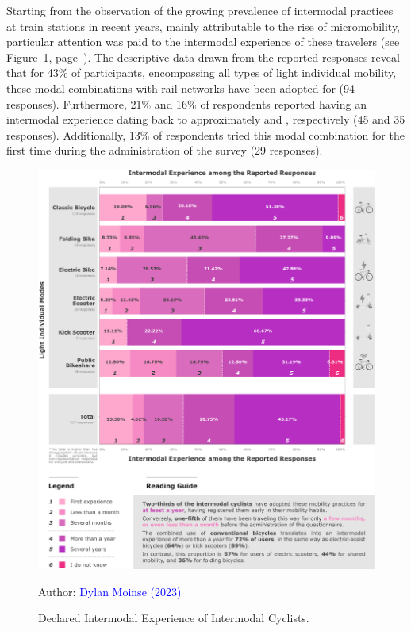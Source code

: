\begin{refsegment}
Starting from the observation of the growing prevalence of intermodal practices at train stations in recent years, mainly attributable to the rise of micromobility, particular attention was paid to the intermodal experience of these travelers (see \hyperref[fig-chap4:experience-intermodale]{Figure~\ref{fig-chap4:experience-intermodale}}, page~\pageref{fig-chap4:experience-intermodale}). The descriptive data drawn from the reported responses reveal that for 43\% of participants, encompassing all types of light individual mobility, these modal combinations with rail networks have been adopted for  (94 responses). Furthermore, 21\% and 16\% of respondents reported having an intermodal experience dating back to approximately  and , respectively (45 and 35 responses). Additionally, 13\% of respondents tried this modal combination for the first time during the administration of the survey (29 responses).%

\begin{figure}[h!]\vspace*{4pt}
    \caption{Declared Intermodal Experience of Intermodal Cyclists.}
    \label{fig-chap4:experience-intermodale}
    \centerline{\includegraphics[width=1\columnwidth]{src/Figures/Chap-4/EN_Experience_intermodale.pdf}}
    \vspace{5pt}
    \begin{flushright}\scriptsize{
    Author: \textcolor{blue}{Dylan Moinse (2023)}
    }\end{flushright}
\end{figure}


\end{refsegment}
